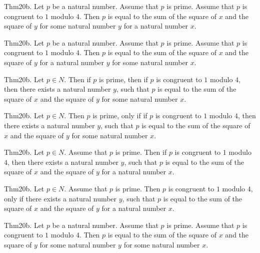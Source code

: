 \documentclass{article}
\begin{document}
Thm20b. Let $p$ be a natural number. Assume that $p$ is prime. Assume that $p$ is congruent to $1$ modulo $4$. Then $p$ is equal to the sum of the square of $x$ and the square of $y$ for some natural number $y$ for a natural number $x$.

Thm20b. Let $p$ be a natural number. Assume that $p$ is prime. Assume that $p$ is congruent to $1$ modulo $4$. Then $p$ is equal to the sum of the square of $x$ and the square of $y$ for a natural number $y$ for some natural number $x$.

Thm20b. Let $p \in N$. Then if $p$ is prime, then if $p$ is congruent to $1$ modulo $4$, then there exists a natural number $y$, such that $p$ is equal to the sum of the square of $x$ and the square of $y$ for some natural number $x$.

Thm20b. Let $p \in N$. Then $p$ is prime, only if if $p$ is congruent to $1$ modulo $4$, then there exists a natural number $y$, such that $p$ is equal to the sum of the square of $x$ and the square of $y$ for some natural number $x$.

Thm20b. Let $p \in N$. Assume that $p$ is prime. Then if $p$ is congruent to $1$ modulo $4$, then there exists a natural number $y$, such that $p$ is equal to the sum of the square of $x$ and the square of $y$ for a natural number $x$.

Thm20b. Let $p \in N$. Assume that $p$ is prime. Then $p$ is congruent to $1$ modulo $4$, only if there exists a natural number $y$, such that $p$ is equal to the sum of the square of $x$ and the square of $y$ for a natural number $x$.

Thm20b. Let $p$ be a natural number. Assume that $p$ is prime. Assume that $p$ is congruent to $1$ modulo $4$. Then $p$ is equal to the sum of the square of $x$ and the square of $y$ for some natural number $y$ for some natural number $x$.
\end{document}
